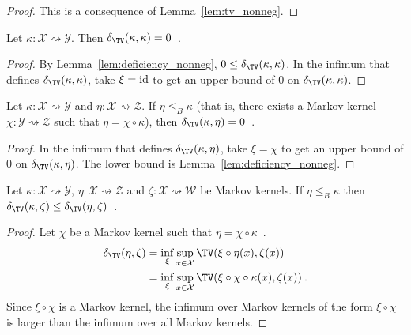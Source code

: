 \begin{proof}%
{}
This is a consequence of Lemma~\ref{lem:tv_nonneg}.
\end{proof}

\begin{lemma}
  \label{lem:deficiency_self}
  Let $\kappa: \mathcal X \rightsquigarrow \mathcal Y$. Then $\delta_{\TV}(\kappa, \kappa) = 0$~.
\end{lemma}

\begin{proof}%
{}
By Lemma~\ref{lem:deficiency_nonneg}, $0 \le \delta_{\TV}(\kappa, \kappa)$.
In the infimum that defines $\delta_{\TV}(\kappa, \kappa)$, take $\xi = \textup{id}$ to get an upper bound of 0 on $\delta_{\TV}(\kappa, \kappa)$.
\end{proof}

\begin{lemma}
  \label{lem:deficiency_comp}
  Let $\kappa: \mathcal X \rightsquigarrow \mathcal Y$ and $\eta : \mathcal X \rightsquigarrow \mathcal Z$.
  If $\eta \le_B \kappa$ (that is, there exists a Markov kernel $\chi : \mathcal Y \rightsquigarrow \mathcal Z$ such that $\eta = \chi \circ \kappa$), then $\delta_{\TV}(\kappa, \eta) = 0$~.
\end{lemma}

\begin{proof}%
{}
In the infimum that defines $\delta_{\TV}(\kappa, \eta)$, take $\xi = \chi$ to get an upper bound of 0 on $\delta_{\TV}(\kappa, \eta)$. The lower bound is Lemma~\ref{lem:deficiency_nonneg}.
\end{proof}

\begin{lemma}
  \label{lem:deficiency_antimono_left}
  Let $\kappa: \mathcal X \rightsquigarrow \mathcal Y$, $\eta : \mathcal X \rightsquigarrow \mathcal Z$ and $\zeta : \mathcal X \rightsquigarrow \mathcal W$ be Markov kernels.
  If $\eta \le_B \kappa$ then $\delta_{\TV}(\kappa, \zeta) \le \delta_{\TV}(\eta, \zeta)$~.
\end{lemma}

\begin{proof}%
\uses{}
Let $\chi$ be a Markov kernel such that $\eta = \chi \circ \kappa$~.
\begin{align*}
\delta_{\TV}(\eta, \zeta)
&= \inf_{\xi} \sup_{x \in \mathcal X} \TV(\xi \circ \eta (x), \zeta(x))
\\
&= \inf_\xi \sup_{x \in \mathcal X} \TV(\xi \circ \chi \circ \kappa (x), \zeta(x))
\: .
\end{align*}
Since $\xi \circ \chi$ is a Markov kernel, the infimum over Markov kernels of the form $\xi \circ \chi$ is larger than the infimum over all Markov kernels.
\end{proof}


